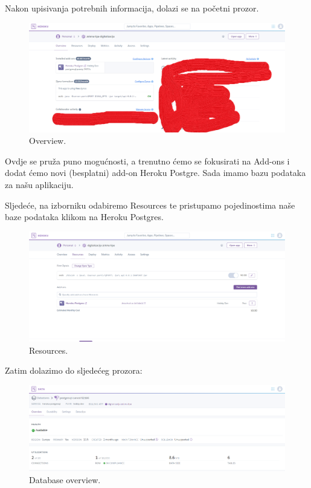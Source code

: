 			 Nakon upisivanja potrebnih informacija, dolazi se na početni prozor.
			 \begin{figure}[H]
			 	\includegraphics[scale=0.3]{slike/Overview.png} 
			 	\centering
			 	\caption{ Overview.}
			 	\label{DS}
			 \end{figure}
			 
			 Ovdje se pruža puno mogućnosti, a trenutno ćemo se fokusirati na Add-ons i dodat ćemo novi (besplatni) add-on Heroku Postgre. Sada imamo bazu podataka za našu aplikaciju.
			 
			 Sljedeće, na izborniku odabiremo Resources te pristupamo pojedinostima naše baze podataka klikom na Heroku Postgres.
			 
			 \begin{figure}[H]
			 	\includegraphics[scale=0.4]{slike/Resources.png} 
			 	\centering
			 	\caption{ Resources.}
			 	\label{DS}
			 \end{figure}
		 
		 Zatim dolazimo do sljedećeg prozora:
			 
			 \begin{figure}[H]
			 	\includegraphics[scale=0.4]{slike/Datastores.png} 
			 	\centering
			 	\caption{ Database overview.}
			 	\label{DS}
			 \end{figure}
		 
